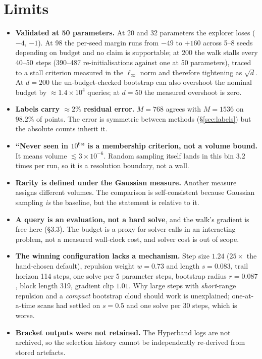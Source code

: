 \documentclass[11pt]{article}
\newcommand{\bad}[1]{\textcolor{red!65!black}{#1}}
\begin{document}
\section{Limits}

\begin{itemize}\itemsep2pt
\item \textbf{Validated at 50 parameters.} At 20 and 32 parameters the explorer
loses ($-4$, $-1$). At 98 the per-seed margin runs from \bad{$-49$ to $+160$}
across 5--8 seeds depending on budget and \bad{no claim is supportable}; at 200
the walk stalls every 40--50 steps (390--487 re-initialisations against one at
50 parameters), traced to a stall criterion measured in the $\ell_\infty$ norm
and therefore tightening as $\sqrt{d}$. At $d=200$ the un-budget-checked
bootstrap can also overshoot the nominal budget by $\approx1.4\times10^4$
queries; at $d=50$ the measured overshoot is zero.
\item \textbf{Labels carry $\approx2\%$ residual error.} $M=768$ agrees with
$M=1536$ on $98.2\%$ of points. The error is symmetric between methods
(\S\ref{sec:labels}) but the absolute counts inherit it.
\item \textbf{``Never seen in $10^6$'' is a membership criterion, not a volume
bound.} It means volume $\lesssim3\times10^{-6}$. Random sampling itself lands
in this bin $3.2$ times per run, so it is a resolution boundary, not a wall.
\item \textbf{Rarity is defined under the Gaussian measure.} Another measure
assigns different volumes. The comparison is self-consistent because Gaussian
sampling \emph{is} the baseline, but the statement is relative to it.
\item \textbf{A query is an evaluation, not a hard solve}, and the walk's
gradient is free here (\S3.3). The budget is a proxy for solver calls in an
interacting problem, not a measured wall-clock cost, and solver cost is out of
scope.
\item \textbf{The winning configuration lacks a mechanism.} Step size $1.24$
($25\times$ the hand-chosen default), repulsion weight $w=0.73$ and length
$s=0.083$, trail horizon 114 steps, one solve per 5 parameter steps, bootstrap
radius $r=0.087$, block length 319, gradient clip $1.01$. Why large steps with
\emph{short}-range repulsion and a \emph{compact} bootstrap cloud should work is
unexplained; one-at-a-time scans had settled on $s=0.5$ and one solve per 30
steps, which is worse.
\item \textbf{Bracket outputs were not retained.} The Hyperband logs are not
archived, so the selection history cannot be independently re-derived from
stored artefacts.
\end{itemize}
\end{document}
